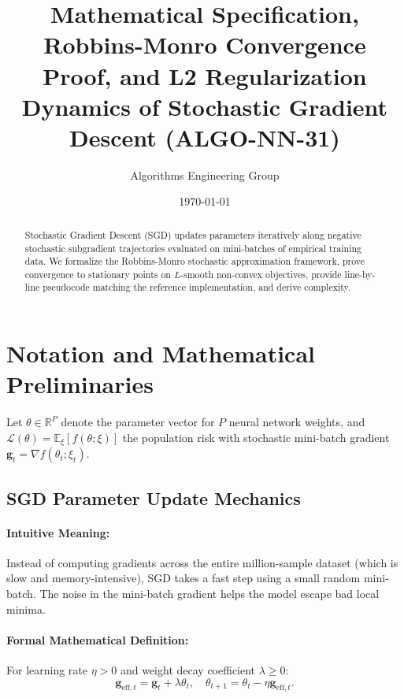 \documentclass[11pt]{article}
\title{\textbf{Mathematical Specification, Robbins-Monro Convergence Proof, and L2 Regularization Dynamics of Stochastic Gradient Descent (ALGO-NN-31)}}
\author{Algorithms Engineering Group}
\date{\today}
\begin{document}
\maketitle

\begin{abstract}
Stochastic Gradient Descent (SGD) updates parameters iteratively along negative stochastic subgradient trajectories evaluated on mini-batches of empirical training data. We formalize the Robbins-Monro stochastic approximation framework, prove convergence to stationary points on $L$-smooth non-convex objectives, provide line-by-line pseudocode matching the reference implementation, and derive complexity.
\end{abstract}

\section{Notation and Mathematical Preliminaries}
\label{sec:notation}

Let $\theta \in \mathbb{R}^P$ denote the parameter vector for $P$ neural network weights, and $\mathcal{L}(\theta) = \mathbb{E}_{\xi}[f(\theta; \xi)]$ the population risk with stochastic mini-batch gradient $\mathbf{g}_t = \nabla f(\theta_t; \xi_t)$.

\subsection{SGD Parameter Update Mechanics}
\paragraph{Intuitive Meaning:} Instead of computing gradients across the entire million-sample dataset (which is slow and memory-intensive), SGD takes a fast step using a small random mini-batch. The noise in the mini-batch gradient helps the model escape bad local minima.

\paragraph{Formal Mathematical Definition:}
For learning rate $\eta > 0$ and weight decay coefficient $\lambda \ge 0$:
\begin{equation}
\label{eq:sgd_update}
\mathbf{g}_{\mathrm{eff}, t} = \mathbf{g}_t + \lambda \theta_t, \quad \theta_{t+1} = \theta_t - \eta \mathbf{g}_{\mathrm{eff}, t}.
\end{equation}
\end{document}
